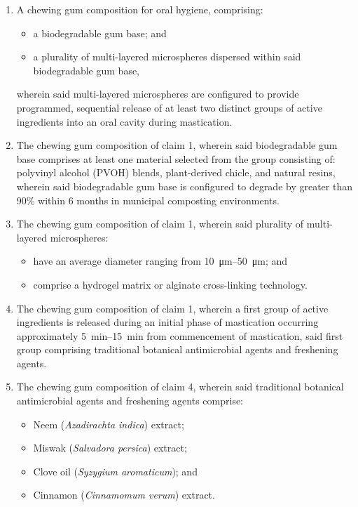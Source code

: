 \documentclass[12pt]{article}
\begin{document}
\begin{enumerate}
    \item A chewing gum composition for oral hygiene, comprising:
    \begin{itemize}
        \item a biodegradable gum base; and
        \item a plurality of multi-layered microspheres dispersed within said biodegradable gum base,
    \end{itemize}
    wherein said multi-layered microspheres are configured to provide programmed, sequential release of at least two distinct groups of active ingredients into an oral cavity during mastication.

    \item The chewing gum composition of claim 1, wherein said biodegradable gum base comprises at least one material selected from the group consisting of: polyvinyl alcohol (PVOH) blends, plant-derived chicle, and natural resins,
    wherein said biodegradable gum base is configured to degrade by greater than 90\% within 6 months in municipal composting environments.

    \item The chewing gum composition of claim 1, wherein said plurality of multi-layered microspheres:
    \begin{itemize}
        \item have an average diameter ranging from \SIrange{10}{50}{\micro\meter}; and
        \item comprise a hydrogel matrix or alginate cross-linking technology.
    \end{itemize}

    \item The chewing gum composition of claim 1, wherein a first group of active ingredients is released during an initial phase of mastication occurring approximately \SIrange{5}{15}{\minute} from commencement of mastication,
    said first group comprising traditional botanical antimicrobial agents and freshening agents.

    \item The chewing gum composition of claim 4, wherein said traditional botanical antimicrobial agents and freshening agents comprise:
    \begin{itemize}
        \item Neem (\textit{Azadirachta indica}) extract;
        \item Miswak (\textit{Salvadora persica}) extract;
        \item Clove oil (\textit{Syzygium aromaticum}); and
        \item Cinnamon (\textit{Cinnamomum verum}) extract.
    \end{itemize}


\end{enumerate}
\end{document}
